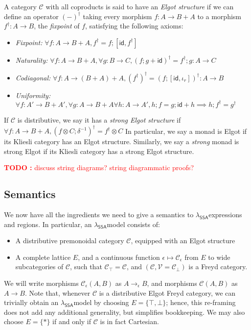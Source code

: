 \documentclass[acmsmall,screen,review]{acmart}
\newcounter{todos}
\newcommand{\TODO}[1]{{
  \stepcounter{todos}
  \begin{center}\large{\textcolor{red}{\textbf{TODO \arabic{todos}:} #1}}\end{center}
}}
\newcommand{\mc}[1]{\ensuremath{\mathcal{#1}}}
\newcommand{\ms}[1]{\ensuremath{\mathsf{#1}}}
\newcommand{\isotopessa}{\(\lambda_{\ms{SSA}}\)}
\begin{document}
\begin{definition}
  A category $\mc{C}$ with all coproducts is said to have an \emph{Elgot structure} if we can define
  an operator $(-)^\dagger$ taking every morphism $f : A \to B + A$ to a morphism $f^\dagger : A \to
  B$, the \emph{fixpoint} of $f$, satisfying the following axioms:
  \begin{itemize}
    \item \emph{Fixpoint:} $\forall f : A \to B + A, f^\dagger = f;[\ms{id}, f^\dagger]$
    \item \emph{Naturality:} $\forall f : A \to B + A, \forall g : B \to C, 
      (f;g + \ms{id})^\dagger = f^\dagger;g : A \to C$
    \item \emph{Codiagonal:} $\forall f : A \to (B + A) + A, 
      (f^\dagger)^\dagger = (f;[\ms{id}, \iota_r])^\dagger : A \to B$
    \item \emph{Uniformity:} 
    $
      \forall f : A' \to B + A', \forall g : A \to B + A \forall h : A \to A', 
        h;f = g;\ms{id} + h \implies h;f^\dagger = g^\dagger
    $
  \end{itemize}
  If $\mc{C}$ is distributive, we say it has a \emph{strong Elgot structure} if
  $
  \forall f: A \to B + A, (f \otimes C ; \delta^{-1})^\dagger = f^\dagger \otimes C
  $
  In particular, we say a monad is Elgot if its Kliesli category has an Elgot structure. Similarly,
  we say a \emph{strong} monad is strong Elgot if its Kliesli category has a strong Elgot structure.
\end{definition}

\TODO{discuss string diagrams? string diagrammatic proofs?}

\subsection{Semantics}

We now have all the ingredients we need to give a semantics to \isotopessa expressions and regions.
In particular, an \isotopessa model consists of:
\begin{itemize}
  \item A distributive premonoidal category $\mc{C}$, equipped with an Elgot structure
  \item A complete lattice $E$, and a continuous function $\epsilon \mapsto \mc{C}_\epsilon$ from
  $E$ to wide subcategories of $\mc{C}$, such that $\mc{C}_\top = \mc{C}$, and $(\mc{C}, \mc{V} =
  \mc{C}_\bot)$ is a Freyd category.
\end{itemize}
We will write morphisms $\mc{C}_\epsilon(A, B)$ as $A \to_\epsilon B$, and morphisms $\mc{C}(A, B)$
as $A \to B$. Note that, whenever $\mc{C}$ is a distributive Elgot Freyd category, we can trivially
obtain an \isotopessa model by choosing $E = \{\top, \bot\}$; hence, this re-framing does not add
any additional generality, but simplifies bookkeeping. We may also choose $E = \{*\}$ if and only if
$\mc{C}$ is in fact Cartesian.
\end{document}
